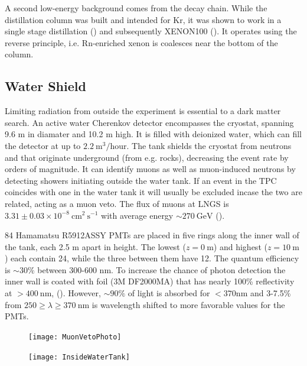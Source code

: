 A second low-energy background comes from the  decay chain.  While the distillation column was built and intended for Kr,
it was shown to work in a single stage distillation () and subsequently XENON100
().  It operates using the reverse principle, i.e. Rn-enriched xenon is coalesces near the bottom of the column.



\subsection{Water Shield}
\label{subsec:xenon1t_water_shield}
Limiting radiation from outside the experiment is essential to a dark matter search.  An active water Cherenkov detector encompasses the
cryostat, spanning 9.6 m in diamater and 10.2 m high.  It is filled with deionized water, which can fill the detector at up to
$2.2\ \mathrm{m^{3}/hour}$.  The tank shields the cryostat from neutrons and \gammarays that originate underground (from e.g. rocks),
decreasing the event rate by orders of magnitude.  It can identify muons as well as muon-induced neutrons by detecting showers initiating
outside the water tank.  If an event in the TPC coincides with one in the water tank it will usually be excluded incase the two are
related, acting as a muon veto.  The flux of muons at LNGS is $3.31 \pm 0.03 \times 10^{-8}\ \mathrm{cm^2\ s^{-1}}$ with average energy
${\sim}270\ \mathrm{GeV}$ ().

84 Hamamatsu R5912ASSY PMTs are placed in five rings along the inner wall of the tank, each 2.5 m apart in height.  The lowest
($z = 0\ \mathrm{m}$) and highest ($z = 10\ \mathrm{m}$) each contain 24, while the three between them have 12.  The quantum efficiency
is ${\sim}30\%$ between 300-600 nm.  To increase the chance of photon detection the inner wall is coated with foil (3M DF2000MA) that has
nearly 100\% reflectivity at $> 400\ \mathrm{nm}$, ().  However, ${\sim}90\%$ of light is absorbed for $<370 \mathrm{nm}$
and 3-7.5\% from $250 \geq \lambda \geq 370\ \mathrm{nm}$ is wavelength shifted to more favorable values for the PMTs.

\begin{figure}
\centering
\texttt{[image: MuonVetoPhoto]}
\label{fig:xenon1t_water_shield_photo}
\end{figure}

\begin{figure}
\centering
\texttt{[image: InsideWaterTank]}
\label{fig:xenon1t_water_shield_interior}
\end{figure}



